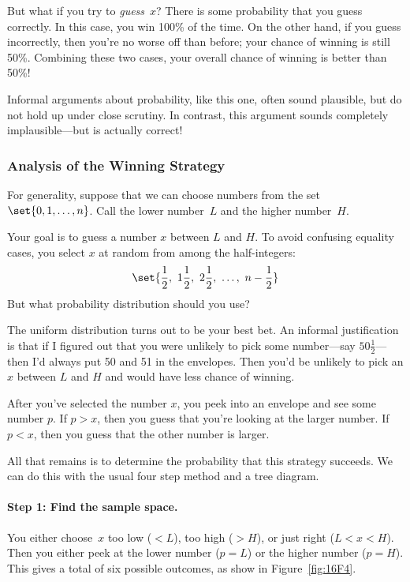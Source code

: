 But what if you try to \emph{guess}~$x$?  There is some probability
that you guess correctly.  In this case, you win 100\% of the time.
On the other hand, if you guess incorrectly, then you're no worse off
than before; your chance of winning is still 50\%.  Combining these
two cases, your overall chance of winning is better than 50\%!

Informal arguments about probability, like this one, often sound
plausible, but do not hold up under close scrutiny.  In contrast, this
argument sounds completely implausible---but is actually correct!

\subsubsection{Analysis of the Winning Strategy}

For generality, suppose that we can choose numbers from the set
$\set{0, 1, \dots, n}$.  Call the lower number~$L$ and the higher
number~$H$.

Your goal is to guess a number $x$ between $L$ and $H$.  To avoid
confusing equality cases, you select $x$ at random from among the
half-integers:
%
\[
\set{\frac{1}{2},\ 1\frac{1}{2},\ 2\frac{1}{2},\ \dots,\ n - \frac{1}{2}}
\]
%
But what probability distribution should you use?

The uniform distribution turns out to be your best bet.  An informal
justification is that if I figured out that you were unlikely to pick
some number---say $50\frac{1}{2}$---then I'd always put 50 and 51 in
the envelopes.  Then you'd be unlikely to pick an $x$ between $L$ and
$H$ and would have less chance of winning.

After you've selected the number $x$, you peek into an envelope and
see some number $p$.  If $p > x$, then you guess that you're looking
at the larger number.  If $p < x$, then you guess that the other
number is larger.

All that remains is to determine the probability that this strategy
succeeds.  We can do this with the usual four step method and a tree
diagram.

\paragraph{Step 1: Find the sample space.}

You either choose~$x$ too low ($< L$), too high ($> H$), or just right
($L < x < H$).  Then you either peek at the lower number ($p = L$) or
the higher number ($p = H$).  This gives a total of six possible
outcomes, as show in Figure~\ref{fig:16F4}.

